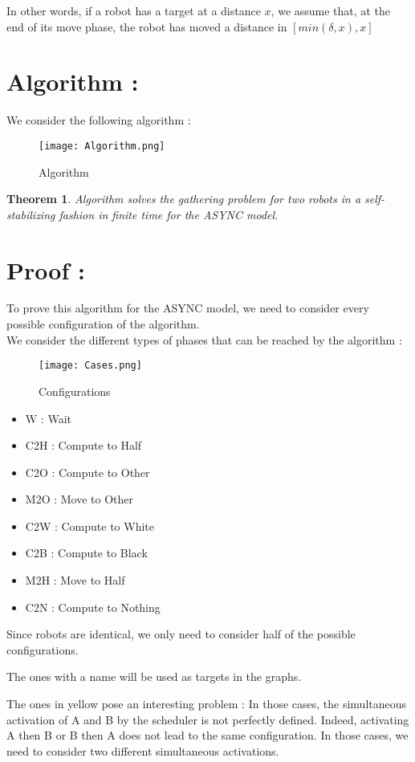 \documentclass[11pt]{article}
\newtheorem{Theorem}{Theorem}
\begin{document}
In other words, if a robot has a target at a distance $x$, we assume that, at the end of its move phase, the robot has moved a distance in $[min(\delta,x),x]$
\section{Algorithm :}

We consider the following algorithm :

\begin{figure}[H]
	\centering
	\texttt{[image: Algorithm.png]}
	\caption{Algorithm}
\end{figure}

\begin{Theorem}
Algorithm solves the gathering problem for two robots in a self-stabilizing fashion in finite time for the ASYNC model.
\end{Theorem}

\section{Proof :}
To prove this algorithm for the ASYNC model, we need to consider every possible configuration of the algorithm.
\\
We consider the different types of phases that can be reached by the algorithm : 
\begin{figure}[H]
	\centering
	\texttt{[image: Cases.png]}
	\caption{Configurations}
\end{figure}

\begin{itemize}
\item W : Wait
\item C2H : Compute to Half
\item C2O : Compute to Other
\item M2O : Move to Other
\item C2W : Compute to White
\item C2B : Compute to Black
\item M2H : Move to Half
\item C2N : Compute to Nothing
\end{itemize}

Since robots are identical, we only need to consider half of the possible configurations. 

The ones with a name will be used as targets in the graphs. 

The ones in yellow pose an interesting problem :
In those cases, the simultaneous activation of A and B by the scheduler is not perfectly defined. Indeed, activating A then B or B then A does not lead to the same configuration. In those cases, we need to consider two different simultaneous activations.
\end{document}
